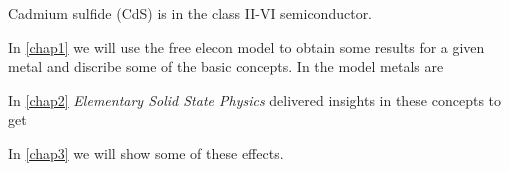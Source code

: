Cadmium sulfide (CdS) is in the class II-VI semiconductor.

In \ref{chap1}  we will use the free elecon model 
to obtain some results for a given metal and discribe some of the
basic concepts. In the model metals are

In \ref{chap2}  
\textit{Elementary Solid State Physics} \cite{elementary_SSP} delivered insights in these concepts to get 

 In \ref{chap3}  we will show some of these effects.


